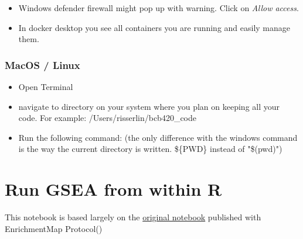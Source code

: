 \documentclass[
]{book}
\newenvironment{Shaded}{\begin{snugshade}}{\end{snugshade}}
\newcommand{\DecValTok}[1]{\textcolor[rgb]{0.00,0.00,0.81}{#1}}
\newcommand{\ErrorTok}[1]{\textcolor[rgb]{0.64,0.00,0.00}{\textbf{#1}}}
\newcommand{\NormalTok}[1]{#1}
\newcommand{\OtherTok}[1]{\textcolor[rgb]{0.56,0.35,0.01}{#1}}
\newcommand{\SpecialCharTok}[1]{\textcolor[rgb]{0.81,0.36,0.00}{\textbf{#1}}}
\newcommand{\StringTok}[1]{\textcolor[rgb]{0.31,0.60,0.02}{#1}}
\providecommand{\tightlist}{%
  \setlength{\itemsep}{0pt}\setlength{\parskip}{0pt}}
\begin{document}
\begin{itemize}
\tightlist
\item
  Windows defender firewall might pop up with warning. Click on \emph{Allow access}.
\item
  In docker desktop you see all containers you are running and easily manage them.
\end{itemize}

\subsection{MacOS / Linux}\label{macos-linux}

\begin{itemize}
\tightlist
\item
  Open Terminal
\item
  navigate to directory on your system where you plan on keeping all your code. For example: /Users/risserlin/bcb420\_code
\item
  Run the following command: (the only difference with the windows command is the way the current directory is written. \$\{PWD\} instead of "\$(pwd)")
\end{itemize}

\begin{Shaded}
\end{Shaded}

\chapter{Run GSEA from within R}\label{run-gsea-from-within-r}

This notebook is based largely on the \href{https://baderlab.github.io/Cytoscape_workflows/EnrichmentMapPipeline/Protocol2_createEM.html}{original notebook} published with EnrichmentMap Protocol()
\end{document}
